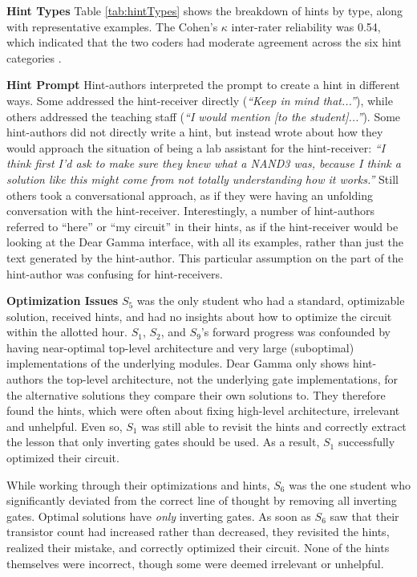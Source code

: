{\bf Hint Types} Table \ref{tab:hintTypes} shows the breakdown of hints by type, along with representative examples. The Cohen's $\kappa$ \cite{cohen1960coefficient} inter-rater reliability was 0.54, which indicated that the two coders had moderate agreement across the six hint categories \cite{viera2005understanding}. 

{\bf Hint Prompt} Hint-authors interpreted the prompt to create a hint in different ways. Some addressed the hint-receiver directly ({\it ``Keep in mind that...''}), while others addressed the teaching staff ({\it ``I would mention [to the student]...''}). Some hint-authors did not directly write a hint, but instead wrote about how they would approach the situation of being a lab assistant for the hint-receiver: {\it ``I think first I'd ask to make sure they knew what a NAND3 was, because I think a solution like this might come from not totally understanding how it works.''} Still others took a conversational approach, as if they were having an unfolding conversation with the hint-receiver. Interestingly, a number of hint-authors referred to ``here'' or ``my circuit'' in their hints, as if the hint-receiver would be looking at the Dear Gamma interface, with all its examples, rather than just the text generated by the hint-author. This particular assumption on the part of the hint-author was confusing for hint-receivers.

{\bf Optimization Issues} $S_5$ was the only student who had a standard, optimizable solution, received hints, and had no insights about how to optimize the circuit within the allotted hour. $S_1$, $S_2$, and $S_9$'s forward progress was confounded by having near-optimal top-level architecture and very large (suboptimal) implementations of the underlying modules. Dear Gamma only shows hint-authors the top-level architecture, not the underlying gate implementations, for the alternative solutions they compare their own solutions to. They therefore found the hints, which were often about fixing high-level architecture, irrelevant and unhelpful. Even so, $S_1$ was still able to revisit the hints and correctly extract the lesson that only inverting gates should be used. As a result, $S_1$ successfully optimized their circuit.

While working through their optimizations and hints, $S_6$ was the one student who significantly deviated from the correct line of thought by removing all inverting gates. Optimal solutions have {\it only} inverting gates. As soon as $S_6$ saw that their transistor count had increased rather than decreased, they revisited the hints, realized their mistake, and correctly optimized their circuit. None of the hints themselves were incorrect, though some were deemed irrelevant or unhelpful.

